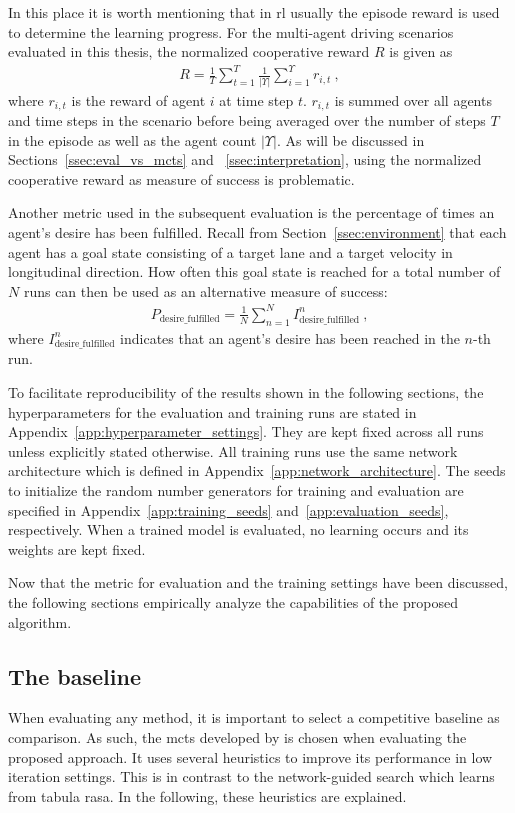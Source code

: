 In this place it is worth mentioning that in \gls{rl} usually the episode reward is used to determine the learning progress. For the multi-agent driving scenarios evaluated in this thesis, the normalized cooperative reward $R$ is given as
\begin{gather}
    R = \frac{1}{T} \sum_{t=1}^T \frac{1}{|\Upsilon|} \sum_{i=1}^\Upsilon r_{i, t}~,
\end{gather}
where $r_{i, t}$ is the reward of agent $i$ at time step $t$. $r_{i, t}$ is summed over all agents and time steps in the scenario before being averaged over the number of steps $T$ in the episode as well as the agent count $|\Upsilon|$. As will be discussed in Sections~\ref{ssec:eval_vs_mcts} and ~\ref{ssec:interpretation}, using the normalized cooperative reward as measure of success is problematic.

Another metric used in the subsequent evaluation is the percentage of times an agent's desire has been fulfilled. Recall from Section~\ref{ssec:environment} that each agent has a goal state consisting of a target lane and a target velocity in longitudinal direction. How often this goal state is reached for a total number of $N$ runs can then be used as an alternative measure of success:
\begin{gather}\label{eq:desire_fulfilled}
    P_{\text{desire\_fulfilled}} = \frac{1}{N} \sum_{n=1}^N I^n_{\text{desire\_fulfilled}}~,
\end{gather}
where $I^n_{\text{desire\_fulfilled}}$ indicates that an agent's desire has been reached in the $n$-th run.

To facilitate reproducibility of the results shown in the following sections, the hyperparameters for the evaluation and training runs are stated in Appendix~\ref{app:hyperparameter_settings}. They are kept fixed across all runs unless explicitly stated otherwise. All training runs use the same network architecture which is defined in Appendix~\ref{app:network_architecture}. The seeds to initialize the random number generators for training and evaluation are specified in Appendix~\ref{app:training_seeds} and~\ref{app:evaluation_seeds}, respectively. When a trained model is evaluated, no learning occurs and its weights are kept fixed.

Now that the metric for evaluation and the training settings have been discussed, the following sections empirically analyze the capabilities of the proposed algorithm.

\subsection{The baseline}\label{ssec:eval_baseline}
When evaluating any method, it is important to select a competitive baseline as comparison. As such, the \gls{mcts} developed by \cite{kurzerDecentralizedCooperativePlanning2018} is chosen when evaluating the proposed approach. It uses several heuristics to improve its performance in low iteration settings. This is in contrast to the network-guided search which learns from tabula rasa. In the following, these heuristics are explained.

